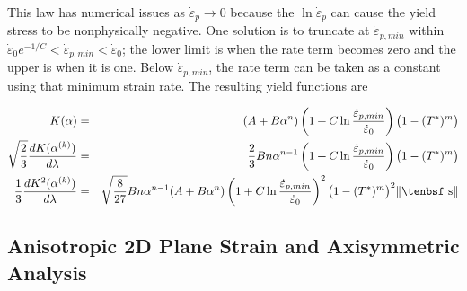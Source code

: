 \documentclass[11pt]{article}
\def\dev{\hbox{\tenbsf s}}
\begin{document}
\noindent This law has numerical issues as $\dot{\varepsilon}_p\to 0$ because the $\ln \dot{\varepsilon}_p$ can cause the yield stress to be nonphysically negative. One solution is to truncate at $\dot{\varepsilon}_{p,min}$ within $\dot{\varepsilon}_0 e^{-1/C} < \dot{\varepsilon}_{p,min} < \dot{\varepsilon}_0$; the lower limit is when the rate term becomes zero and the upper is when it is one. Below $\dot{\varepsilon}_{p,min}$, the rate term can be taken as a constant using that minimum strain rate. The resulting yield functions are

\begin{eqnarray}
   K(\alpha) & = &  (A+B\alpha^n)\left(1+C\ln{\dot{\varepsilon}_{p,min}\over \dot{\varepsilon}_0}\right)\bigl(1-(T^*)^m\bigr) \\
   \sqrt{2\over3}{dK(\alpha^{(k)})\over d\lambda} & = &  {2\over 3} B n \alpha^{n-1}\left(1+C\ln{\dot{\varepsilon}_{p,min}\over \dot{\varepsilon}_0}\right)
                   \bigl(1-(T^*)^m\bigr)\\
   {1\over3}{dK^2(\alpha^{(k)})\over d\lambda} & = & \sqrt{8\over27}B n \alpha^{n-1}(A+B\alpha^n)\left(1+C\ln{\dot{\varepsilon}_{p,min}\over \dot{\varepsilon}_0}\right)^2
                   \bigl(1-(T^*)^m\bigr)^2   \|\dev\|
\end{eqnarray}

\subsection{Anisotropic 2D Plane Strain and Axisymmetric Analysis}
\end{document}
